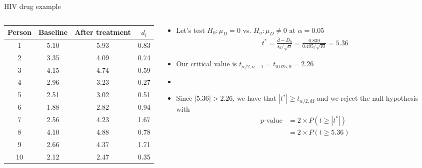 \documentclass[xcolor=dvipsnames]{beamer}
\begin{document}
\begin{frame}{HIV drug example}
	\begin{columns}
		\begin{column}{.4 \textwidth}
			{\tiny
				\begin{tabular}{|c|c|c|c|}
					\hline
					\textbf{Person} & \textbf{Baseline} &  \textbf{After treatment} & $d_i$ \\ \hline \hline
					1  &    5.10 &   5.93 &  0.83 \\ \hline 
					2  &    3.35 &   4.09 &  0.74 \\ \hline 
					3  &   4.15  &  4.74 &  0.59 \\ \hline 
					4  &   2.96  &  3.23 &  0.27 \\ \hline 
					5  &    2.51 &   3.02 &  0.51 \\ \hline 
					6  &   1.88  &  2.82 &  0.94 \\ \hline 
					7  &   2.56  &  4.23 &  1.67 \\ \hline 
					8  &    4.10 &   4.88 &  0.78 \\ \hline 
					9  &   2.66  &  4.37 &  1.71 \\ \hline 
					10  &    2.12  &  2.47 &  0.35 \\ \hline 
				\end{tabular}
			}
		\end{column}
	\begin{column}{.6 \textwidth}
		\vspace{-5pt}
		\begin{itemize}
			\item Let's test $H_0: \mu_D = 0$ vs. $H_a: \mu_D \neq 0$ at $\alpha = 0.05$ \pause
			\begin{align*}
			t^* = \frac{\bar{d}-D_0}{s_d / \sqrt{n}} = \frac{0.839}{0.495 / \sqrt{10}} = 5.36
			\end{align*} \pause
			\item Our critical value is $t_{\alpha / 2, n-1} = t_{0.025, 9} = 2.26$ \pause
			\item[]
			\item Since $|5.36| > 2.26$, we have that $|t^*| \geq t_{\alpha / 2, \text{df}}$ and we reject the null hypothesis with
			\begin{align*}
				p\text{-value}&=2 \times P(t \geq |t^*|)\\ 
				&= 2 \times P(t\geq 5.36) 
			\end{align*} 
		\end{itemize}
	\end{column}
	\end{columns}
\end{frame}
\end{document}
